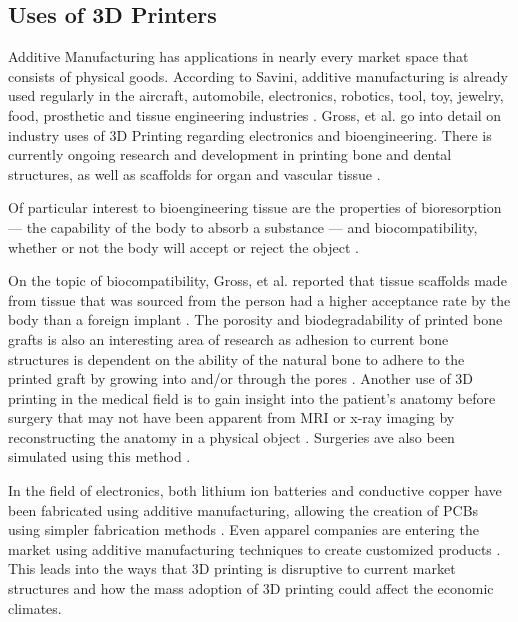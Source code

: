 \subsection{Uses of 3D Printers}
	Additive Manufacturing has applications in nearly every market space that consists of physical goods. According to Savini, additive manufacturing is already used regularly in the aircraft, automobile, electronics, robotics, tool, toy, jewelry, food, prosthetic and tissue engineering industries \citep{Savini2015}. Gross, et al. go into detail on industry uses of 3D Printing regarding electronics and bioengineering. There is currently ongoing research and development in printing bone and dental structures, as well as scaffolds for organ and vascular tissue \citep{Gross2014}.\par
	Of particular interest to bioengineering tissue are the properties of bioresorption --- the capability of the body to absorb a substance --- and biocompatibility, whether or not the body will accept or reject the object \citep{Gross2014}.\par
On the topic of biocompatibility, Gross, et al. reported that tissue scaffolds made from tissue that was sourced from the person had a higher acceptance rate by the body than a foreign implant \citep{Gross2014}. The porosity and biodegradability of printed bone grafts is also an interesting area of research as adhesion to current bone structures is dependent on the ability of the natural bone to adhere to the printed graft by growing into and/or through the pores \citep{Gross2014}. Another use of 3D printing in the medical field is to gain insight into the patient's anatomy before surgery that may not have been apparent from MRI or x-ray imaging by reconstructing the anatomy in a physical object \citep{Gross2014}. Surgeries ave also been simulated using this method \citep{Gross2014}.\par
	In the field of electronics, both lithium ion batteries and conductive copper have been fabricated using additive manufacturing, allowing the creation of PCBs using simpler fabrication methods \citep{Gross2014}. Even apparel companies are entering the market using additive manufacturing techniques to create customized products \citep{Weller2015}. This leads into the ways that 3D printing is disruptive to current market structures and how the mass adoption of 3D printing could affect the economic climates.\par

